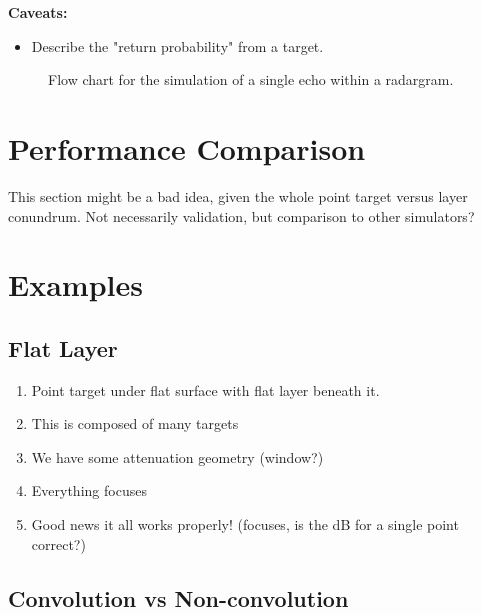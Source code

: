 \documentclass[lettersize,journal]{IEEEtran}
\begin{document}
\textbf{Caveats:}
\begin{itemize}
    \item Describe the "return probability" from a target. 
\end{itemize}

\begin{figure}[t]
\centering

\caption{Flow chart for the simulation of a single echo within a radargram.}
\label{fig:flowchart}
\end{figure}

\section{Performance Comparison}
This section might be a bad idea, given the whole point target versus layer conundrum. Not necessarily validation, but comparison to other simulators?

\section{Examples}

\subsection{Flat Layer}

\begin{enumerate}
    \item Point target under flat surface with flat layer beneath it. 
    \item This is composed of many targets
    \item We have some attenuation geometry (window?)
    \item Everything focuses
    \item Good news it all works properly! (focuses, is the dB for a single point correct?)
\end{enumerate}

\subsection{Convolution vs Non-convolution}
\end{document}
